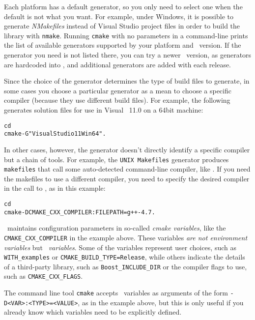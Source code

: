 Each platform has a default generator, so you only need to select one when
the default is not what you want.  For example, under Windows, it is
possible to generate \emph{NMakefiles} instead of Visual Studio project
files in order to build the library with \texttt{nmake}.  Running
\texttt{cmake} with no parameters in a command-line prints the list of
available generators supported by your platform and \cmake\ version. If the
generator you need is not listed there, you can try a newer 
\cmake\ version, as generators are hardcoded into \cmake, and additional
generators are added with each release.

Since the choice of the generator determines the type of build files to generate, in some cases
you choose a particular generator as a mean to choose a specific compiler (because they use different 
build files). For example, the following generates solution files for
use in Visual \CC\ 11.0 on a 64bit machine:

{\ccTexHtml{}{}
\begin{alltt}
  cd \cgalrel
  cmake -G"Visual Studio 11 Win64" . 
\end{alltt}
}

In other cases, however, the generator doesn't directly identify a
specific compiler but a chain of tools.
For example, the \texttt{UNIX Makefiles} generator produces \texttt{makefiles} that call some auto-detected
command-line compiler, like \gcc. If you need the makefiles to use a different compiler, you need to
specify the desired compiler in the call to \cmake{}, as in this example:

{\ccTexHtml{}{}
\begin{alltt}
  cd \cgalrel
  cmake -DCMAKE_CXX_COMPILER:FILEPATH=g++-4.7 . 
\end{alltt}
}

\cmake\ maintains configuration parameters in so-called \emph{cmake variables}, like the \texttt{CMAKE\_CXX\_COMPILER}
in the example above. These variables \emph{are not environment variables} but \emph{\cmake\ variables}. Some of the \cmake{} 
variables represent user choices, such as \texttt{WITH\_examples} or \texttt{CMAKE\_BUILD\_TYPE=Release}, while others
indicate the details of a third-party library, such as \texttt{Boost\_INCLUDE\_DIR} or the compiler flags to use,
such as \texttt{CMAKE\_CXX\_FLAGS}. 

The command line tool \texttt{cmake} accepts \cmake\ variables as arguments of the form \texttt{-D<VAR>:<TYPE>=<VALUE>}, as
in the example above, but this is only useful if you already know which variables need to be explicitly defined.

